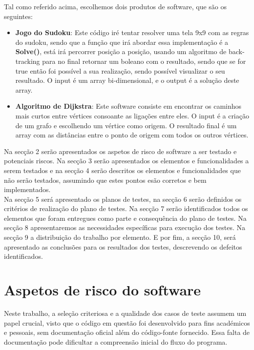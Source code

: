 \documentclass{article}
\begin{document}
\quad Tal como referido acima, escolhemos dois produtos de software, que são os seguintes:

\begin{itemize}
    \item \textbf{Jogo do Sudoku}: Este código iré tentar resolver uma tela 9x9 com as regras do sudoku, sendo que a função que irá abordar essa implementação é a \textbf{Solve()}, está irá percorrer posição a posição, usando um algoritmo de back-tracking para no final retornar um boleano com o resultado, sendo que se for true então foi possível a sua realização, sendo possível visualizar o seu resultado. O input é um array bi-dimensional, e o output é a solução deste array.
    \item \textbf{Algoritmo de Dijkstra}: Este software consiste em encontrar os caminhos mais curtos entre vértices consoante as ligações entre eles. O input é a criação de um grafo e escolhendo um vértice como origem. O resultado final é um array com as distâncias entre o ponto de origem com todos os outros vértices.

\end{itemize}
Na secção 2 serão apresentados os aspetos de risco de software a ser testado e potenciais riscos. Na secção 3 serão apresentados os elementos e funcionalidades a serem testados e na secção 4 serão descritos os elementos e funcionalidades que não serão testados, assumindo que estes pontos esão corretos e bem implementados. \\
Na secção 5 será apresentado os planos de testes, na secção 6 serão definidos os critérios de realização do plano de testes. Na secção 7 serão identificados todos os elementos que foram entregues como parte e consequência do plano de testes. Na secção 8 apresentaremos as necessidades específicas para execução dos testes. Na secção 9 a distribuição do trabalho por elemento. E por fim, a secção 10, será apresentado as conclusões para os resultados dos testes, descrevendo os defeitos identificados.

\section{Aspetos de risco do software}
Neste trabalho, a seleção criteriosa e a qualidade dos casos de teste assumem um papel crucial, visto que o código em questão foi desenvolvido para fins académicos e pessoais, sem documentação oficial além do código-fonte fornecido. Essa falta de documentação pode dificultar a compreensão inicial do fluxo do programa.
\end{document}
